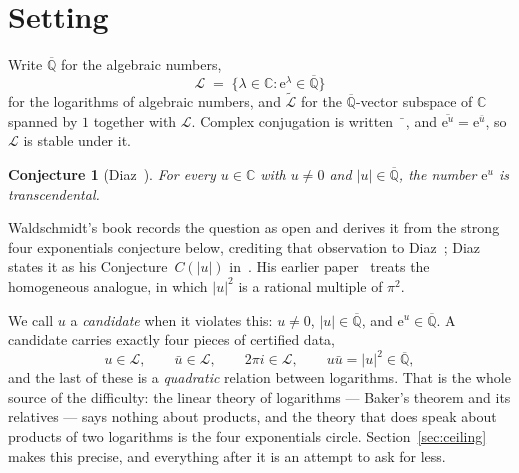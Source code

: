 \documentclass[11pt,a4paper]{article}
\theoremstyle{plain}
\newtheorem{conjecture}[theorem]{Conjecture}
\theoremstyle{definition}
\newcommand{\C}{\mathbb{C}}
\newcommand{\e}{\mathrm{e}}
\newcommand{\Alg}{\overline{\mathbb{Q}}}
\newcommand{\Logs}{\mathcal{L}}
\newcommand{\aLogs}{\widetilde{\mathcal{L}}}
\begin{document}
\section{Setting}\label{sec:setting}

Write $\Alg$ for the algebraic numbers,
\[
  \Logs \;=\; \{\lambda\in\C : \e^{\lambda}\in\Alg\}
\]
for the logarithms of algebraic numbers, and $\aLogs$ for the $\Alg$-vector subspace of $\C$
spanned by $1$ together with $\Logs$. Complex conjugation is written $\bar{\phantom{u}}$, and
$\overline{\e^{u}}=\e^{\bar u}$, so $\Logs$ is stable under it.

\begin{conjecture}[Diaz~\cite{waldschmidt-book,diaz-2004}]\label{conj:diaz}
For every $u\in\C$ with $u\neq0$ and $\lvert u\rvert\in\Alg$, the number $\e^{u}$ is
transcendental.
\end{conjecture}

Waldschmidt's book records the question as open and derives it from the strong four exponentials
conjecture below, crediting that observation to Diaz~\cite[p.~399]{waldschmidt-book}; Diaz states
it as his Conjecture~$C(\lvert u\rvert)$ in~\cite[\S5.1]{diaz-2004}. His earlier
paper~\cite{diaz-1997} treats the homogeneous analogue, in which $\lvert u\rvert^{2}$ is a rational
multiple of $\pi^{2}$.

We call $u$ a \emph{candidate} when it violates this: $u\neq0$, $\lvert u\rvert\in\Alg$, and
$\e^{u}\in\Alg$. A candidate carries exactly four pieces of certified data,
\[
  u\in\Logs,\qquad \bar u\in\Logs,\qquad 2\pi i\in\Logs,\qquad u\bar u=\lvert u\rvert^{2}\in\Alg ,
\]
and the last of these is a \emph{quadratic} relation between logarithms. That is the whole
source of the difficulty: the linear theory of logarithms --- Baker's theorem and its relatives
--- says nothing about products, and the theory that does speak about products of two
logarithms is the four exponentials circle. Section~\ref{sec:ceiling} makes this precise, and
everything after it is an attempt to ask for less.
\end{document}
